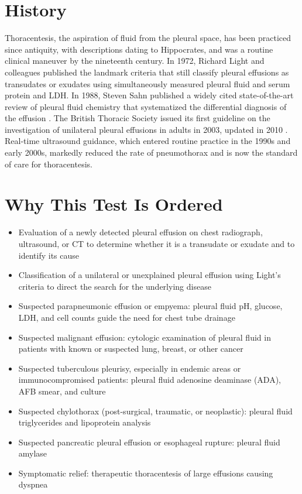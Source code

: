 \section*{History}
Thoracentesis, the aspiration of fluid from the pleural space, has been practiced since antiquity, with descriptions dating to Hippocrates, and was a routine clinical maneuver by the nineteenth century. In 1972, Richard Light and colleagues published the landmark criteria that still classify pleural effusions as transudates or exudates using simultaneously measured pleural fluid and serum protein and LDH. In 1988, Steven Sahn published a widely cited state-of-the-art review of pleural fluid chemistry that systematized the differential diagnosis of the effusion \cite{sahn1988pleura}. The British Thoracic Society issued its first guideline on the investigation of unilateral pleural effusions in adults in 2003, updated in 2010 \cite{maskell2003bts,hooper2010investigation}. Real-time ultrasound guidance, which entered routine practice in the 1990s and early 2000s, markedly reduced the rate of pneumothorax and is now the standard of care for thoracentesis.
\section*{Why This Test Is Ordered}
\begin{itemize}
  \item Evaluation of a newly detected pleural effusion on chest radiograph, ultrasound, or CT to determine whether it is a transudate or exudate and to identify its cause
  \item Classification of a unilateral or unexplained pleural effusion using Light's criteria to direct the search for the underlying disease
  \item Suspected parapneumonic effusion or empyema: pleural fluid pH, glucose, LDH, and cell counts guide the need for chest tube drainage
  \item Suspected malignant effusion: cytologic examination of pleural fluid in patients with known or suspected lung, breast, or other cancer
  \item Suspected tuberculous pleurisy, especially in endemic areas or immunocompromised patients: pleural fluid adenosine deaminase (ADA), AFB smear, and culture
  \item Suspected chylothorax (post-surgical, traumatic, or neoplastic): pleural fluid triglycerides and lipoprotein analysis
  \item Suspected pancreatic pleural effusion or esophageal rupture: pleural fluid amylase
  \item Symptomatic relief: therapeutic thoracentesis of large effusions causing dyspnea
\end{itemize}
